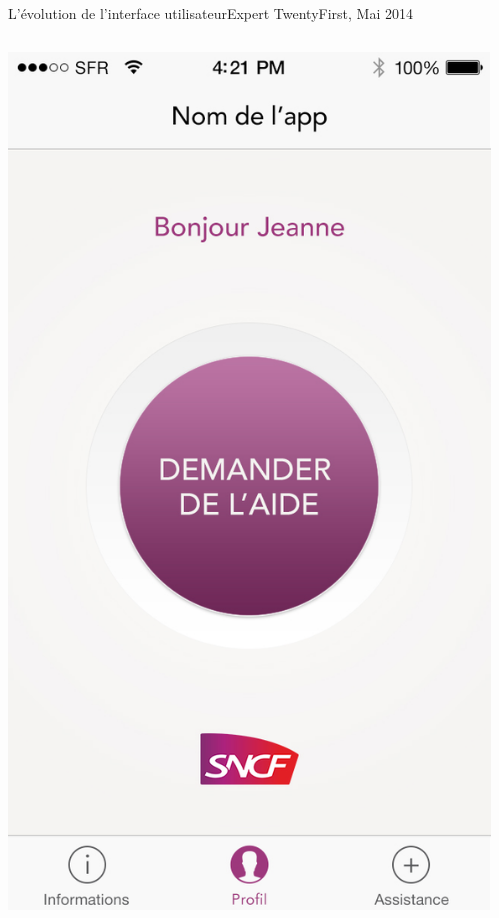 \documentclass{beamer}
\begin{document}
\begin{frame}{L'évolution de l'interface utilisateur}{Expert TwentyFirst, Mai 2014}
    \begin{columns}
        \begin{column}{0.45\textwidth}
            \includegraphics[width=\textwidth]{thibault-04/01-home.jpg}
        \end{column}
        \begin{column}{0.45\textwidth}

\end{column}
\end{columns}
\end{frame}
\end{document}
